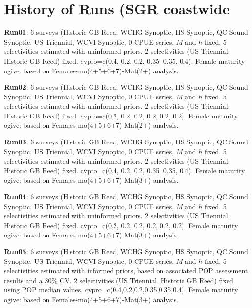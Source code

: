 
\section*{History of Runs (SGR coastwide}

{\bf Run01}: 6 surveys (Historic GB Reed, WCHG Synoptic, HS Synoptic, QC Sound Synoptic, US Triennial, WCVI Synoptic, 0 CPUE series, $M$ and $h$ fixed. 5 selectivities estimated with uninformed priors. 2 selectivities (US Triennial,  Historic GB Reed) fixed. cvpro=c(0.4, 0.2, 0.2, 0.35, 0.35, 0.4).  Female maturity ogive: based on Females-mo(4+5+6+7)-Mat(2+) analysis. \newline  

{\bf Run02}: 6 surveys (Historic GB Reed, WCHG Synoptic, HS Synoptic, QC Sound Synoptic, US Triennial, WCVI Synoptic, 0 CPUE series, $M$ and $h$ fixed. 5 selectivities estimated with uninformed priors. 2 selectivities (US Triennial,  Historic GB Reed) fixed. cvpro=c(0.2, 0.2, 0.2, 0.2, 0.2, 0.2).  Female maturity ogive: based on Females-mo(4+5+6+7)-Mat(2+) analysis. \newline  

{\bf Run03}: 6 surveys (Historic GB Reed, WCHG Synoptic, HS Synoptic, QC Sound Synoptic, US Triennial, WCVI Synoptic, 0 CPUE series, $M$ and $h$ fixed. 5 selectivities estimated with uninformed priors. 2 selectivities (US Triennial,  Historic GB Reed) fixed. cvpro=c(0.4, 0.2, 0.2, 0.35, 0.35, 0.4).  Female maturity ogive: based on Females-mo(4+5+6+7)-Mat(3+) analysis. \newline  

{\bf Run04}: 6 surveys (Historic GB Reed, WCHG Synoptic, HS Synoptic, QC Sound Synoptic, US Triennial, WCVI Synoptic, 0 CPUE series, $M$ and $h$ fixed. 5 selectivities estimated with uninformed priors. 2 selectivities (US Triennial,  Historic GB Reed) fixed. cvpro=c(0.2, 0.2, 0.2, 0.2, 0.2, 0.2).  Female maturity ogive: based on Females-mo(4+5+6+7)-Mat(3+) analysis. \newline  

{\bf Run05}: 6 surveys (Historic GB Reed, WCHG Synoptic, HS Synoptic, QC Sound Synoptic, US Triennial, WCVI Synoptic, 0 CPUE series, $M$ and $h$ fixed. 5 selectivities estimated with informed priors, based on associated POP assessment results and a 30\% CV. 2 selectivities (US Triennial,  Historic GB Reed) fixed using POP median values. cvpro=c(0.4,0.2,0.2,0.35,0.35,0.4).  Female maturity ogive: based on Females-mo(4+5+6+7)-Mat(3+) analysis. \newline  





